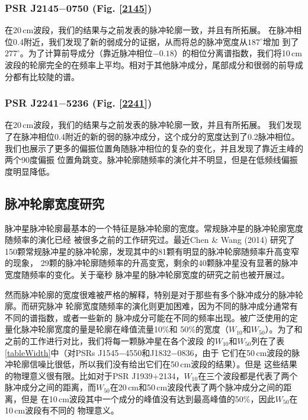 \subsubsection{PSR J2145$-$0750 (Fig. \ref{2145})}

在20\,cm波段，我们的结果与之前发表的脉冲轮廓一致，并且有所拓展\supercite{Yan11a}。
在脉冲相位0.4附近，我们发现了新的弱成分的证据，从而将总的脉冲宽度从$187^{\circ}$增加
到了$277^{\circ}$。为了计算前导成分（靠近脉冲相位$-0.18$）的相位分离谱指数，我们将10\,cm
波段的轮廓完全的在频率上平均。相对于其他脉冲成分，尾部成分和很弱的前导成分都有比较陡的谱。

\subsubsection{PSR J2241$-$5236 (Fig. \ref{2241})}

在20\,cm波段，我们的结果与之前发表的脉冲轮廓一致，并且有所拓展\supercite{Yan11a}。
我们发现了在脉冲相位0.4附近的新的弱的脉冲成分，这个成分的宽度达到了0.2脉冲相位。
我们也展示了更多的偏振位置角随脉冲相位的复杂的变化，并且发现了靠近主峰的两个90度偏振
位置角跳变。脉冲轮廓随频率的演化并不明显，但是在低频线偏振度明显降低。

\subsection{脉冲轮廓宽度研究}

脉冲星脉冲轮廓最基本的一个特征是脉冲轮廓的宽度。常规脉冲星的脉冲轮廓宽度随频率的演化已经
被很多之前的工作研究过\supercite{Cordes78,Thorsett91}。最近Chen \& Wang (2014)\supercite{Chen14}
研究了150颗常规脉冲星的脉冲轮廓，发现其中的81颗有明显的脉冲轮廓随频率升高变窄的现象，
29颗的脉冲轮廓随频率的升高变宽，剩余的40颗脉冲星没有显著的脉冲宽度随频率的变化。关于毫秒
脉冲星的脉冲轮廓宽度的研究之前也被开展过\supercite{Kramer99}。

然而脉冲轮廓的宽度很难被严格的解释，特别是对于那些有多个脉冲成分的脉冲轮廓。而研究脉冲
轮廓宽度随频率的演化则更加困难，因为不同的脉冲成分通常有不同的谱指数，或者一些新的
脉冲成分可能在不同的频率出现。被广泛使用的定量化脉冲轮廓宽度的量是轮廓在峰值流量10\%和
50\%的宽度（$W_{10}$和$W_{50}$）。为了和之前的工作进行对比，我们将每一颗脉冲星在各个波段
的$W_{10}$和$W_{50}$列在了表\ref{tableWidth}中（对PSRs J1545$-$4550和J1832$-$0836，由于
它们在50\,cm波段的脉冲轮廓信噪比很低，所以我们没有给出它们在50\,cm波段的结果）。但是
这些结果的物理意义很有限。比如对于PSR J1939$+$2134，$W_{10}$在三个波段都是代表了两个
脉冲成分之间的距离，而$W_{50}$在20\,cm和50\,cm波段代表了两个脉冲成分之间的距离，但是
在10\,cm波段其中一个成分的峰值没有达到最高峰值的50\%，因此$W_{50}$在10\,cm波段有不同的
物理意义。

